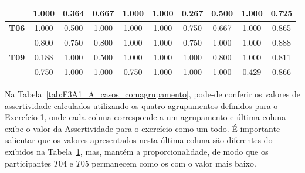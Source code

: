 \begin{table}[htbp]
\begin{tabular}{|cccccccccc|}
		\rowcolor[HTML]{F2F2F2} 
		\multicolumn{1}{|c|}{\cellcolor[HTML]{F2F2F2}\textbf{T05}} & \multicolumn{1}{c|}{\cellcolor[HTML]{F2F2F2}1.000} & \multicolumn{1}{c|}{\cellcolor[HTML]{F2F2F2}0.364} & \multicolumn{1}{c|}{\cellcolor[HTML]{F2F2F2}0.667} & \multicolumn{1}{c|}{\cellcolor[HTML]{F2F2F2}1.000} & \multicolumn{1}{c|}{\cellcolor[HTML]{F2F2F2}1.000} & \multicolumn{1}{c|}{\cellcolor[HTML]{F2F2F2}0.267} & \multicolumn{1}{c|}{\cellcolor[HTML]{F2F2F2}0.500} & \multicolumn{1}{c|}{\cellcolor[HTML]{F2F2F2}1.000} & 0.725 \\ \hline
		\multicolumn{1}{|c|}{\textbf{T06}} & \multicolumn{1}{c|}{1.000} & \multicolumn{1}{c|}{0.500} & \multicolumn{1}{c|}{1.000} & \multicolumn{1}{c|}{1.000} & \multicolumn{1}{c|}{1.000} & \multicolumn{1}{c|}{0.750} & \multicolumn{1}{c|}{0.667} & \multicolumn{1}{c|}{1.000} & 0.865 \\ \hline
		\rowcolor[HTML]{F2F2F2} 
		\multicolumn{1}{|c|}{\cellcolor[HTML]{F2F2F2}\textbf{T08}} & \multicolumn{1}{c|}{\cellcolor[HTML]{F2F2F2}0.800} & \multicolumn{1}{c|}{\cellcolor[HTML]{F2F2F2}0.750} & \multicolumn{1}{c|}{\cellcolor[HTML]{F2F2F2}0.800} & \multicolumn{1}{c|}{\cellcolor[HTML]{F2F2F2}1.000} & \multicolumn{1}{c|}{\cellcolor[HTML]{F2F2F2}1.000} & \multicolumn{1}{c|}{\cellcolor[HTML]{F2F2F2}0.750} & \multicolumn{1}{c|}{\cellcolor[HTML]{F2F2F2}1.000} & \multicolumn{1}{c|}{\cellcolor[HTML]{F2F2F2}1.000} & 0.888 \\ \hline
		\multicolumn{1}{|c|}{\textbf{T09}} & \multicolumn{1}{c|}{0.188} & \multicolumn{1}{c|}{1.000} & \multicolumn{1}{c|}{0.500} & \multicolumn{1}{c|}{1.000} & \multicolumn{1}{c|}{1.000} & \multicolumn{1}{c|}{1.000} & \multicolumn{1}{c|}{0.800} & \multicolumn{1}{c|}{1.000} & 0.811 \\ \hline
		\rowcolor[HTML]{F2F2F2} 
		\multicolumn{1}{|c|}{\cellcolor[HTML]{F2F2F2}\textbf{T10}} & \multicolumn{1}{c|}{\cellcolor[HTML]{F2F2F2}0.750} & \multicolumn{1}{c|}{\cellcolor[HTML]{F2F2F2}1.000} & \multicolumn{1}{c|}{\cellcolor[HTML]{F2F2F2}1.000} & \multicolumn{1}{c|}{\cellcolor[HTML]{F2F2F2}0.750} & \multicolumn{1}{c|}{\cellcolor[HTML]{F2F2F2}1.000} & \multicolumn{1}{c|}{\cellcolor[HTML]{F2F2F2}1.000} & \multicolumn{1}{c|}{\cellcolor[HTML]{F2F2F2}1.000} & \multicolumn{1}{c|}{\cellcolor[HTML]{F2F2F2}0.429} & 0.866 \\ \hline
	\end{tabular}
	\label{tab:F3A1_A_casos_semagrupamento}
\end{table}

Na Tabela~\ref{tab:F3A1_A_casos_comagrupamento}, pode-de conferir os valores de assertividade calculados utilizando os quatro agrupamentos definidos para o Exercício 1, onde cada coluna corresponde a um agrupamento e última coluna exibe o valor da Assertividade para o exercício como um todo. É importante salientar que os valores apresentados nesta última coluna são diferentes do exibidos na Tabela~\ref{tab:F3A1_A_casos_semagrupamento}, mas, mantém a proporcionalidade, de modo que os participantes $T04$ e $T05$ permanecem como os com o valor mais baixo.


